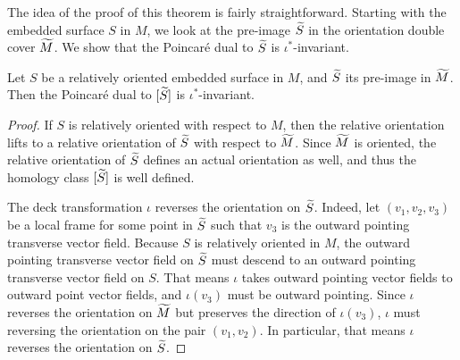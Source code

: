 The idea of the proof of this theorem is fairly straightforward.
Starting with the embedded surface $S$ in $M$, we look at the pre-image $\widetilde{S}$ in the orientation double cover $\widetilde{M}$.
We show that the Poincar\'e dual to $\widetilde{S}$ is $\iota^{\ast}$-invariant.
\begin{lem}
  \label{lem:PD1}
  Let $S$ be a relatively oriented embedded surface in $M$, and $\widetilde{S}$ its pre-image in $\widetilde{M}$.
  Then the Poincar\'e dual to $[\widetilde{S}]$ is $\iota^{\ast}$-invariant.
\end{lem}
\begin{proof}
  If $S$ is relatively oriented with respect to $M$, then the relative orientation lifts to a relative orientation of $\widetilde{S}$ with respect to $\widetilde{M}$.
  Since $\widetilde{M}$ is oriented, the relative orientation of $\widetilde{S}$ defines an actual orientation as well, and thus the homology class $[\widetilde{S}]$ is well defined.

  The deck transformation $\iota$ reverses the orientation on $\widetilde{S}$.
  Indeed, let $(v_1, v_2, v_3)$ be a local frame for some point in $\widetilde{S}$ such that
  $v_3$ is the outward pointing transverse vector field.
  Because $S$ is relatively oriented in $M$, the outward pointing transverse vector field on $\widetilde{S}$ must descend to an outward pointing transverse vector field on $S$.
  That means $\iota$ takes outward pointing vector fields to outward point vector fields, and $\iota(v_3)$ must be outward pointing.
  Since $\iota$ reverses the orientation on $\widetilde{M}$ but preserves the direction of $\iota(v_3)$, $\iota$ must reversing the orientation on the pair $(v_1, v_2)$.
  In particular, that means $\iota$ reverses the orientation on $\widetilde{S}$.


\end{proof}
